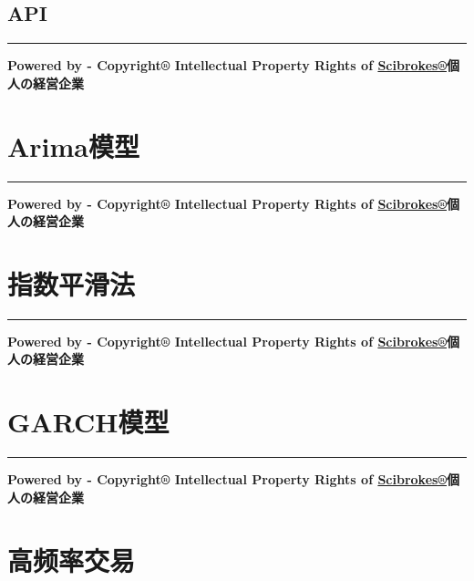 \documentclass[]{book}
\theoremstyle{definition}
\theoremstyle{definition}
\theoremstyle{definition}
\theoremstyle{remark}
\begin{document}
\hypertarget{api}{%
\subsection{API}\label{api}}

\begin{center}\rule{0.5\linewidth}{\linethickness}\end{center}

\textbf{Powered by - Copyright® Intellectual Property Rights of
\href{http://www.scibrokes.com}{Scibrokes®}個人の経営企業}

\hypertarget{arima}{%
\section{Arima模型}\label{arima}}

\begin{center}\rule{0.5\linewidth}{\linethickness}\end{center}

\textbf{Powered by - Copyright® Intellectual Property Rights of
\href{http://www.scibrokes.com}{Scibrokes®}個人の経営企業}

\section{指数平滑法}

\begin{center}\rule{0.5\linewidth}{\linethickness}\end{center}

\textbf{Powered by - Copyright® Intellectual Property Rights of
\href{http://www.scibrokes.com}{Scibrokes®}個人の経営企業}

\hypertarget{garch}{%
\section{GARCH模型}\label{garch}}

\begin{center}\rule{0.5\linewidth}{\linethickness}\end{center}

\textbf{Powered by - Copyright® Intellectual Property Rights of
\href{http://www.scibrokes.com}{Scibrokes®}個人の経営企業}

\section{高频率交易}
\end{document}
